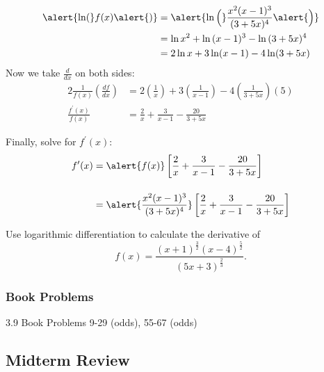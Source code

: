 \documentclass[cal1spr16Lectures.tex]{subfiles}
\begin{document}
\begin{frame}\footnotesize
\begin{alignat*}{2}
\alert{\ln(}f(x)\alert{)} &= \alert{\ln \Big(} \frac{x^2(x-1)^3}{(3+5x)^4} \alert{\Big)} \\%
&= \ln{x^2} + \ln{(x-1)^3}-\ln{(3+5x)^4} \\%
&= 2\ln x + 3\ln(x-1)-4\ln(3+5x)
\end{alignat*}
\alert{Now} we take $\textstyle\frac{d}{dx}$ on both sides:
\begin{alignat*}{2}
\frac{1}{f(x)}\left(\frac{df}{dx}\right) &= 2\left(\frac{1}{x}\right) + 3\left(\frac{1}{x-1}\right) - 4\left(\frac{1}{3+5x}\right)(5) \\[1pc]
\frac{f^{\prime}(x)}{f(x)} &= \frac{2}{x} + \frac{3}{x-1} - \frac{20}{3+5x}
\end{alignat*}
\end{frame}

\begin{frame}{}
Finally, solve for $f^{\prime}(x)$:
\begin{alignat*}{2}
f^{\prime}(x) &= \alert{f(x)} \left[ \frac{2}{x} + \frac{3}{x-1} - \frac{20}{3+5x} \right] \\[1pc]
&= \alert{\frac{x^2 (x-1)^3}{(3+5x)^4}} \left[ \frac{2}{x} + \frac{3}{x-1} - \frac{20}{3+5x} \right]
\end{alignat*}
\end{frame}

\begin{frame}
\begin{exe}
Use logarithmic differentiation to calculate the derivative of 
\[
f(x)=\frac{(x+1)^{\frac{3}{2}}(x-4)^{\frac{5}{2}}}{(5x+3)^{\frac{2}{3}}}.
\]
\end{exe}
\end{frame}

\subsubsection{Book Problems}

\begin{frame}
\begin{block}{3.9 Book Problems} 9-29 (odds), 55-67 (odds) \end{block}
\end{frame}


\subsection{Midterm Review}
\end{document}

